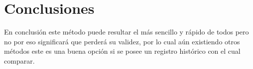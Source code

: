     
    
    
    
    
    
    \section{Conclusiones}
    
    En conclusión este método puede resultar el más sencillo y rápido de todos pero no por eso significará que perderá su validez, por lo cual aún existiendo otros métodos este es una buena opción si se posee un registro histórico con el cual comparar.
    
